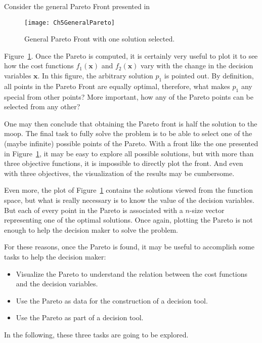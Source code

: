 Consider the general Pareto Front presented in 
\begin{figure}[b]
	\centering
	\texttt{[image: Ch5GeneralPareto]}
	\caption{General Pareto Front with one solution selected.}
	\label{fig:Ch5GeneralPareto}
\end{figure}
%
Figure~\ref{fig:Ch5GeneralPareto}. Once the Pareto is computed, it is certainly very useful to plot it to see how the cost functions $f_1(\mathbf{x})$ and $f_2(\mathbf{x})$ vary with the change in the decision variables $\mathbf{x}$. In this figure, the arbitrary solution $p_1$ is pointed out. By definition, all points in the Pareto Front are equally optimal, therefore, what makes $p_1$ any special from other points? More important, how any of the Pareto points can be selected from any other?

One may then conclude that obtaining the Pareto front is half the solution to the \gls{moop}. The final task to fully solve the problem is to be able to select one of the (maybe infinite) possible points of the Pareto. With a front like the one presented in Figure~\ref{fig:Ch5GeneralPareto}, it may be easy to explore all possible solutions, but with more than three objective functions, it is impossible to directly plot the front. And even with three objectives, the visualization of the results may be cumbersome.

Even more, the plot of Figure~\ref{fig:Ch5GeneralPareto} contains the solutions viewed from the function space, but what is really necessary is to know the value of the decision variables. But each of every point in the Pareto is associated with a $n$-size vector representing one of the optimal solutions. Once again, plotting the Pareto is not enough to help the decision maker to solve the problem.

For these reasons, once the Pareto is found, it may be useful to accomplish some tasks to help the decision maker:
\begin{itemize}
	\item  Visualize the Pareto to understand the relation between the cost functions and the decision variables.
	\item Use the Pareto as data for the construction of a decision tool.
	\item Use the Pareto as part of a decision tool.
\end{itemize}
In the following, these three tasks are going to be explored.
%
